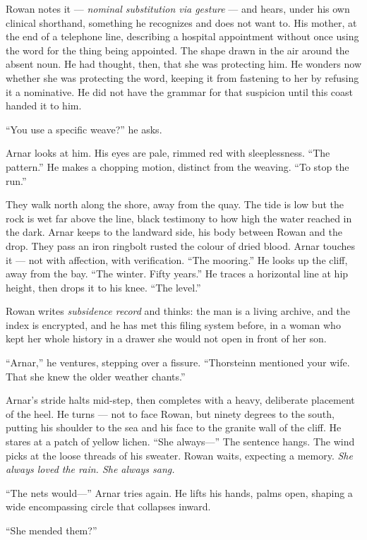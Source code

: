 \documentclass[11pt,oneside]{book}
\begin{document}
Rowan notes it --- \emph{nominal substitution via gesture} --- and
hears, under his own clinical shorthand, something he recognizes and
does not want to. His mother, at the end of a telephone line, describing
a hospital appointment without once using the word for the thing being
appointed. The shape drawn in the air around the absent noun. He had
thought, then, that she was protecting him. He wonders now whether she
was protecting the word, keeping it from fastening to her by refusing it
a nominative. He did not have the grammar for that suspicion until this
coast handed it to him.

``You use a specific weave?'' he asks.

Arnar looks at him. His eyes are pale, rimmed red with sleeplessness.
``The pattern.'' He makes a chopping motion, distinct from the weaving.
``To stop the run.''

They walk north along the shore, away from the quay. The tide is low but
the rock is wet far above the line, black testimony to how high the
water reached in the dark. Arnar keeps to the landward side, his body
between Rowan and the drop. They pass an iron ringbolt rusted the colour
of dried blood. Arnar touches it --- not with affection, with
verification. ``The mooring.'' He looks up the cliff, away from the bay.
``The winter. Fifty years.'' He traces a horizontal line at hip height,
then drops it to his knee. ``The level.''

Rowan writes \emph{subsidence record} and thinks: the man is a living
archive, and the index is encrypted, and he has met this filing system
before, in a woman who kept her whole history in a drawer she would not
open in front of her son.

``Arnar,'' he ventures, stepping over a fissure. ``Thorsteinn mentioned
your wife. That she knew the older weather chants.''

Arnar's stride halts mid-step, then completes with a heavy, deliberate
placement of the heel. He turns --- not to face Rowan, but ninety
degrees to the south, putting his shoulder to the sea and his face to
the granite wall of the cliff. He stares at a patch of yellow lichen.
``She always---'' The sentence hangs. The wind picks at the loose
threads of his sweater. Rowan waits, expecting a memory. \emph{She
always loved the rain. She always sang.}

``The nets would---'' Arnar tries again. He lifts his hands, palms open,
shaping a wide encompassing circle that collapses inward.

``She mended them?''
\end{document}
